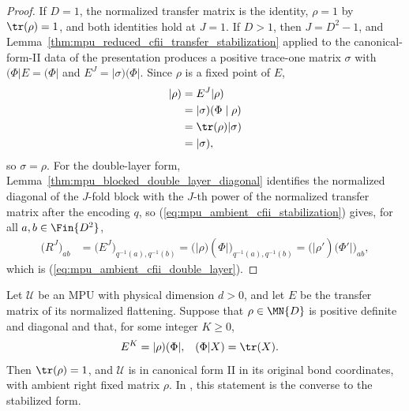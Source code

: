 \begin{proof}\leanok
    If $D=1$, the normalized transfer matrix is the identity, $\rho=1$ by
    $\tr(\rho)=1$, and both identities hold at $J=1$. If $D>1$, then
    $J=D^2-1$, and
    Lemma~\ref{thm:mpu_reduced_cfii_transfer_stabilization} applied to the
    canonical-form-II data of the presentation produces a positive trace-one
    matrix $\sigma$ with $(\Phi\rvert E=(\Phi\rvert$ and
    $E^J=\lvert\sigma)(\Phi\rvert$. Since $\rho$ is a fixed point of $E$,
    \begin{align}
        \lvert\rho) & =E^J\lvert\rho)              \\
                    & =\lvert\sigma)(\Phi\mid\rho) \\
                    & =\tr(\rho)\lvert\sigma)      \\
                    & =\lvert\sigma),
    \end{align}
    so $\sigma=\rho$. For the double-layer form,
    Lemma~\ref{thm:mpu_blocked_double_layer_diagonal} identifies the
    normalized diagonal of the $J$-fold block with the $J$-th power of the
    normalized transfer matrix after the encoding $q$, so
    (\ref{eq:mpu_ambient_cfii_stabilization}) gives, for all
    $a,b\in\Fin{D^2}$,
    \begin{align}
        \bigl(R^J\bigr)_{ab}
         & =\bigl(E^J\bigr)_{q^{-1}(a),q^{-1}(b)}
        =\bigl(\lvert\rho)(\Phi\rvert\bigr)_{q^{-1}(a),q^{-1}(b)}
        =\bigl(\lvert\rho')(\Phi'\rvert\bigr)_{ab},
    \end{align}
    which is (\ref{eq:mpu_ambient_cfii_double_layer}).
\end{proof}

\begin{lemma}
    \label{thm:mpu_canonical_form_ii_stabilization_converse}
    \leanok
    Let $\mathcal U$ be an MPU with physical dimension $d>0$, and let $E$
    be the transfer matrix of its normalized flattening. Suppose that
    $\rho\in\MN{D}$ is positive definite and diagonal and that, for some
    integer $K\geq0$,
    \begin{align}
        E^K & =\lvert\rho)(\Phi\rvert,
            & (\Phi\rvert X)           & =\tr(X).
    \end{align}
    Then $\tr(\rho)=1$, and $\mathcal U$ is in canonical form II in its
    original bond coordinates, with ambient right fixed matrix $\rho$.
    In \cite[Proposition~III.1]{Cirac2017MPU}, this statement is the converse to the stabilized
    form.
\end{lemma}


